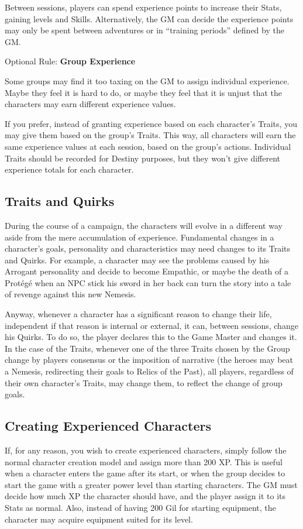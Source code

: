 \begin{multicols}{2}
Between sessions, players can spend experience points to increase their Stats, gaining levels and Skills. Alternatively, the GM can decide the experience points may only be spent  between adventures or  in “training periods” defined by the GM\@. 

\begin{boco}
Optional Rule: \textbf{Group Experience}\pc%

Some groups may find it too taxing on the GM to assign individual experience. Maybe they feel it is hard to do, or maybe they feel that it is unjust that the characters may earn different experience values.

If you prefer, instead of granting experience based on each character's Traits, you may give them based on the group's Traits. This way, all characters will earn the same experience values at each session, based on the group's actions. Individual Traits should be recorded for Destiny purposes, but they won't give different experience totals for each character.
\end{boco}

\subsection{Traits and Quirks}\label{subsec:gm-traits}
During the course of a campaign, the characters will evolve in a different way aside from the mere accumulation of experience. Fundamental changes in a character’s goals, personality and characteristics may need changes to its Traits and Quirks. For example, a character may see the problems caused by his Arrogant personality and decide to become Empathic, or maybe the death of a Protégé when an NPC stick his sword in her back can turn the story into a tale of revenge against this new Nemesis.

Anyway, whenever a character has a significant reason to change their life, independent if that reason is internal or external, it can, between sessions, change his Quirks. To do so, the player declares this to the Game Master and changes it. In the case of the Traits, whenever one of the three Traits chosen by the Group change by players consensus or the imposition of narrative (the heroes may beat a Nemesis, redirecting their goals to Relics of the Past), all players, regardless of their own character’s Traits, may change them, to reflect the change of group goals.

\subsection{Creating Experienced Characters}\label{subsec:gm-expchars}
If, for any reason, you wish to create experienced characters, simply follow the normal character creation model and assign more than 200 XP\@. This is useful when a character enters the game after its start, or when the group decides to start the game with a greater power level than starting characters. The GM must decide how much XP the character should have, and the player assign it to its Stats as normal. Also, instead of having 200 Gil for starting equipment, the character may acquire equipment suited for its level.


\end{multicols}
